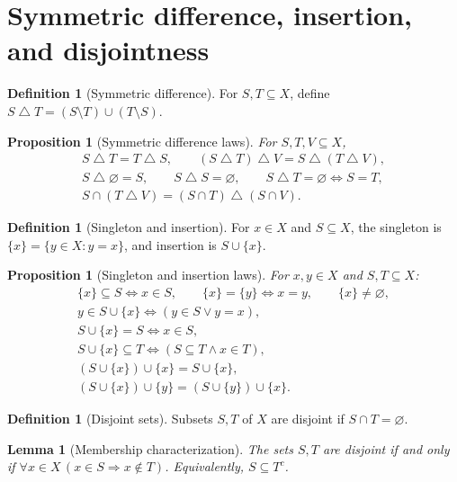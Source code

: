 \documentclass[11pt]{article}
\newtheorem{lemma}[theorem]{Lemma}
\newtheorem{proposition}[theorem]{Proposition}
\theoremstyle{definition}
\newtheorem{definition}[theorem]{Definition}
\begin{document}
\newpage
\section{Symmetric difference, insertion, and disjointness}
\begin{definition}[Symmetric difference]
For $S,T\subseteq X$, define
$S\mathbin{\triangle}T=(S\setminus T)\cup(T\setminus S)$.
\end{definition}
\begin{proposition}[Symmetric difference laws]
For $S,T,V\subseteq X$,
\begin{gather*}
S\mathbin{\triangle}T=T\mathbin{\triangle}S,\qquad
(S\mathbin{\triangle}T)\mathbin{\triangle}V
=S\mathbin{\triangle}(T\mathbin{\triangle}V),\\
S\mathbin{\triangle}\varnothing=S,\qquad S\mathbin{\triangle}S=\varnothing,\qquad
S\mathbin{\triangle}T=\varnothing\iff S=T,\\
S\cap(T\mathbin{\triangle}V)
=(S\cap T)\mathbin{\triangle}(S\cap V).
\end{gather*}
\end{proposition}
\begin{definition}[Singleton and insertion]
For $x\in X$ and $S\subseteq X$, the singleton is
$\{x\}=\{y\in X:y=x\}$, and insertion is $S\cup\{x\}$.
\end{definition}
\begin{proposition}[Singleton and insertion laws]
For $x,y\in X$ and $S,T\subseteq X$:
\begin{gather*}
\{x\}\subseteq S\iff x\in S,\qquad
\{x\}=\{y\}\iff x=y,\qquad \{x\}\ne\varnothing,\\
y\in S\cup\{x\}\iff(y\in S\lor y=x),\\
S\cup\{x\}=S\iff x\in S,\\
S\cup\{x\}\subseteq T\iff(S\subseteq T\land x\in T),\\
(S\cup\{x\})\cup\{x\}=S\cup\{x\},\\
(S\cup\{x\})\cup\{y\}=(S\cup\{y\})\cup\{x\}.
\end{gather*}
\end{proposition}
\begin{definition}[Disjoint sets]
Subsets $S,T$ of $X$ are disjoint if $S\cap T=\varnothing$.
\end{definition}
\begin{lemma}[Membership characterization]
The sets $S,T$ are disjoint if and only if
$\forall x\in X\,(x\in S\Rightarrow x\notin T)$.
Equivalently, $S\subseteq T^c$.
\end{lemma}
\end{document}
